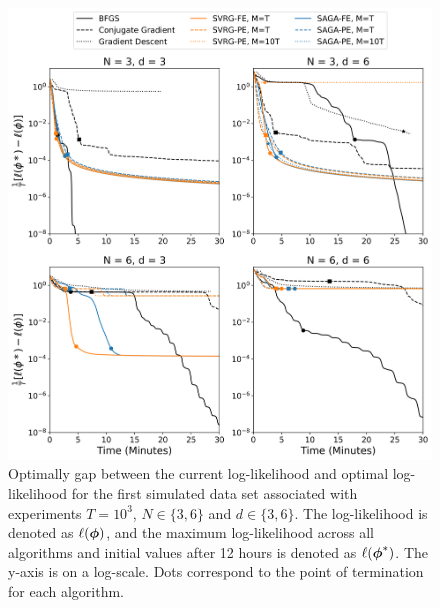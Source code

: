 \documentclass[12pt]{article}
\begin{document}
\begin{figure}[H]
    \centering
    \includegraphics[width=6.5in]{../plt/log-like_v_time_T-1000-000.png}
    \caption{Optimally gap between the current log-likelihood and optimal log-likelihood for the first simulated data set associated with experiments $T=10^{3}$, $N \in \{3,6\}$ and $d \in \{3,6\}$. The log-likelihood is denoted as $\ell(\boldsymbol{\phi})$, and the maximum log-likelihood across all algorithms and initial values after 12 hours is denoted as $\ell(\boldsymbol{\phi}^*)$. The y-axis is on a log-scale. Dots correspond to the point of termination for each algorithm.}
\end{figure}
%
\end{document}
